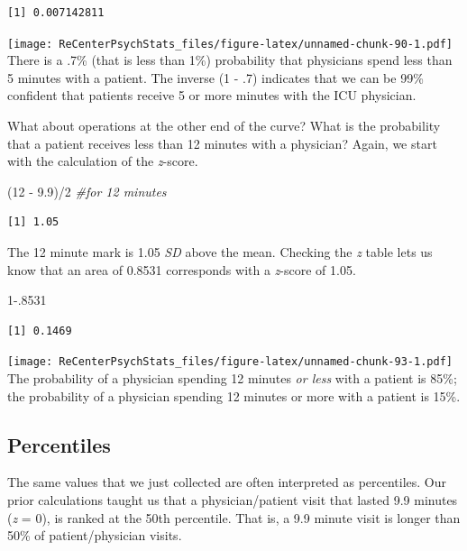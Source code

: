 \documentclass[
  11pt,
]{book}
\newenvironment{Shaded}{\begin{snugshade}}{\end{snugshade}}
\newcommand{\CommentTok}[1]{\textcolor[rgb]{0.56,0.35,0.01}{\textit{#1}}}
\newcommand{\DecValTok}[1]{\textcolor[rgb]{0.00,0.00,0.81}{#1}}
\newcommand{\FloatTok}[1]{\textcolor[rgb]{0.00,0.00,0.81}{#1}}
\newcommand{\NormalTok}[1]{#1}
\newcommand{\SpecialCharTok}[1]{\textcolor[rgb]{0.00,0.00,0.00}{#1}}
\begin{document}
\begin{verbatim}
[1] 0.007142811
\end{verbatim}

\texttt{[image: ReCenterPsychStats\_files/figure-latex/unnamed-chunk-90-1.pdf]}
There is a .7\% (that is less than 1\%) probability that physicians spend less than 5 minutes with a patient. The inverse (1 - .7) indicates that we can be 99\% confident that patients receive 5 or more minutes with the ICU physician.

What about operations at the other end of the curve? What is the probability that a patient receives less than 12 minutes with a physician? Again, we start with the calculation of the \emph{z}-score.

\begin{Shaded}
\begin{Highlighting}[]
\NormalTok{(}\DecValTok{12} \SpecialCharTok{{-}} \FloatTok{9.9}\NormalTok{)}\SpecialCharTok{/}\DecValTok{2}  \CommentTok{\#for 12 minutes}
\end{Highlighting}
\end{Shaded}

\begin{verbatim}
[1] 1.05
\end{verbatim}

The 12 minute mark is 1.05 \emph{SD} above the mean. Checking the \emph{z} table lets us know that an area of 0.8531 corresponds with a \emph{z}-score of 1.05.

\begin{Shaded}
\begin{Highlighting}[]
\DecValTok{1}\FloatTok{{-}.8531}
\end{Highlighting}
\end{Shaded}

\begin{verbatim}
[1] 0.1469
\end{verbatim}

\texttt{[image: ReCenterPsychStats\_files/figure-latex/unnamed-chunk-93-1.pdf]}
The probability of a physician spending 12 minutes \emph{or less} with a patient is 85\%; the probability of a physician spending 12 minutes or more with a patient is 15\%.

\hypertarget{percentiles}{%
\subsection{Percentiles}\label{percentiles}}

The same values that we just collected are often interpreted as percentiles. Our prior calculations taught us that a physician/patient visit that lasted 9.9 minutes (\emph{z} = 0), is ranked at the 50th percentile. That is, a 9.9 minute visit is longer than 50\% of patient/physician visits.
\end{document}
